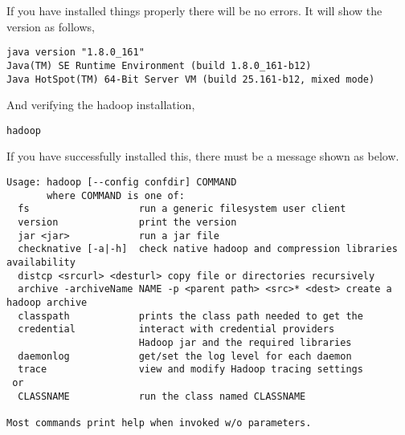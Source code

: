 If you have installed things properly there will be no errors. It will
show the version as follows,

\begin{lstlisting}
java version "1.8.0_161"
Java(TM) SE Runtime Environment (build 1.8.0_161-b12)
Java HotSpot(TM) 64-Bit Server VM (build 25.161-b12, mixed mode)
\end{lstlisting}

And verifying the hadoop installation,

\begin{lstlisting}
hadoop
\end{lstlisting}

If you have successfully installed this, there must be a message shown
as below.

\begin{lstlisting}
Usage: hadoop [--config confdir] COMMAND
       where COMMAND is one of:
  fs                   run a generic filesystem user client
  version              print the version
  jar <jar>            run a jar file
  checknative [-a|-h]  check native hadoop and compression libraries availability
  distcp <srcurl> <desturl> copy file or directories recursively
  archive -archiveName NAME -p <parent path> <src>* <dest> create a hadoop archive
  classpath            prints the class path needed to get the
  credential           interact with credential providers
                       Hadoop jar and the required libraries
  daemonlog            get/set the log level for each daemon
  trace                view and modify Hadoop tracing settings
 or
  CLASSNAME            run the class named CLASSNAME

Most commands print help when invoked w/o parameters.
\end{lstlisting}
